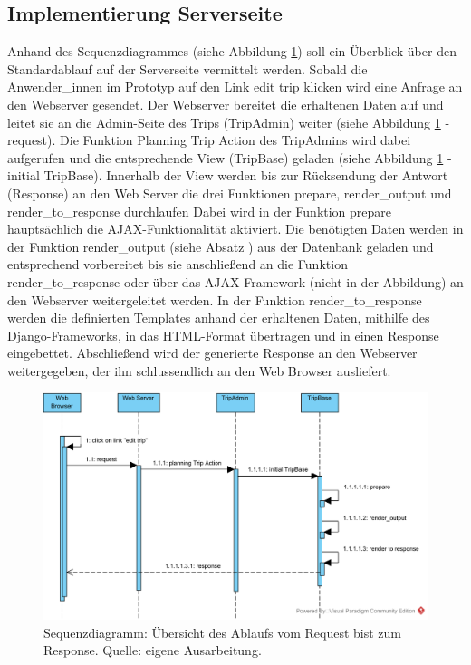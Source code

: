 \documentclass[Bachelorarbeit.tex]{subfiles}
\begin{document}
\subsection{Implementierung Serverseite}
\label{implServer}
Anhand des Sequenzdiagrammes (siehe Abbildung \ref{fig:Overview}) soll ein  Überblick über den Standardablauf auf der Serverseite vermittelt werden. 
Sobald die Anwender\_innen im  Prototyp auf den Link edit trip klicken wird eine  Anfrage an den Webserver gesendet.
Der Webserver bereitet die erhaltenen Daten auf und leitet sie an die Admin-Seite des Trips (TripAdmin) weiter (siehe Abbildung \ref{fig:Overview} - request). 
Die Funktion Planning Trip Action des TripAdmins wird dabei aufgerufen und die entsprechende View (TripBase) geladen (siehe Abbildung \ref{fig:Overview} - initial TripBase).
Innerhalb der View werden bis zur Rücksendung der Antwort (Response) an den Web Server die drei Funktionen prepare, render\_output und render\_to\_response durchlaufen
Dabei wird in der Funktion prepare hauptsächlich die \ac{AJAX}-Funktionalität aktiviert.
Die benötigten Daten werden in der Funktion render\_output (siehe Absatz ) aus der Datenbank geladen und entsprechend vorbereitet bis sie anschließend an die Funktion render\_to\_response oder über das \ac{AJAX}-Framework (nicht in der Abbildung) an den Webserver weitergeleitet werden.
In der Funktion render\_to\_response werden die definierten Templates anhand der erhaltenen Daten, mithilfe des Django-Frameworks, in das \ac{HTML}-Format übertragen und in einen Response eingebettet.
Abschließend wird der generierte Response an den Webserver weitergegeben, der ihn schlussendlich an den Web Browser ausliefert.


\begin{figure}[h]
\centering
\includegraphics[width=1\linewidth]{img/Implementierung/Overview}
\caption[k]{Sequenzdiagramm: Übersicht des Ablaufs vom Request bist zum Response. Quelle: eigene Ausarbeitung.}
\label{fig:Overview}
\end{figure}
\end{document}
